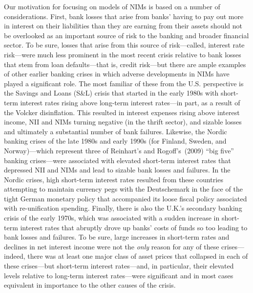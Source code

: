 \documentclass[11pt]{article}
\begin{document}
Our motivation for focusing on models of NIMs is based on a number of considerations. First, bank losses that arise from banks' having to pay out more in interest on their liabilities than they are earning from their assets should not be overlooked as an important source of risk to the banking and broader financial sector.  To be sure, losses that arise from this source of risk---called, interest rate risk---were much less prominent in the most recent crisis relative to bank losses that stem from loan defaults---that is, credit risk---but there are ample examples of other earlier banking crises in which adverse developments in NIMs have played a significant role.  The most familiar of these from the U.S. perspective is the Savings and Loans (S\&L) crisis that started in the early 1980s with short-term interest rates rising above long-term interest rates---in part, as a result of the Volcker disinflation.  This resulted in interest expenses rising above interest income, NII and NIMs turning negative (in the thrift sector), and sizable losses and ultimately a substantial number of bank failures.  Likewise, the Nordic banking crises of the late 1980s and early 1990s (for Finland, Sweden, and Norway)---which represent three of Reinhart's and Rogoff's~(2009) ``big five'' banking crises---were associated with elevated short-term interest rates that depressed NII and NIMs and lead to sizable bank losses and failures. In the Nordic crises, high short-term interest rates resulted from these countries attempting to maintain currency pegs with the Deutschemark in the face of the tight German monetary policy that accompanied its loose fiscal policy associated with re-unification spending. Finally, there is also the U.K.'s secondary banking crisis of the early 1970s, which was associated with a sudden increase in short-term interest rates that abruptly drove up banks' costs of funds so too leading to bank losses and failures.  To be sure, large increases in short-term rates and declines in net interest income were not the \textit{only} reason for any of these crises---indeed, there was at least one major class of asset prices that collapsed in each of these crises---but short-term interest rates---and, in particular, their elevated levels relative to long-term interest rates---were significant and in most cases equivalent in importance to the other causes of the crisis.
\end{document}
